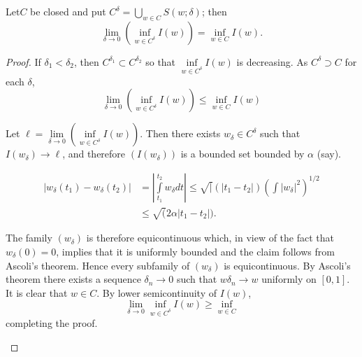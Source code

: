 \begin{lemma}\label{chap22-lem3}
Let\pageoriginale $C$ be closed and put
$C^{\delta}=\bigcup\limits_{w\in C}S(w;\delta)$; then
$$
\lim\limits_{\delta\to 0}(\inf\limits_{w\in
  C^{\delta}}I(w))=\inf\limits_{w\in C}I(w).
$$
\end{lemma}

\begin{proof}
If $\delta_{1}<\delta_{2}$, then $C^{\delta_{1}}\subset
C^{\delta_{2}}$ so that $\inf\limits_{w\in C^{\delta}}I(w)$ is
decreasing. As $C^{\delta}\supset C$ for each $\delta$,
$$
\lim\limits_{\delta\to 0}(\inf\limits_{w\in C^{\delta}}I(w))\leq
\inf\limits_{w\in C}I(w)
$$

Let $\ell=\lim\limits_{\delta\to 0}(\inf\limits_{w\in
  C^{\delta}}I(w))$. Then there exists $w_{\delta}\in C^{\delta}$ such
that $I(w_{\delta})\to \ell$, and therefore $(I(w_{\delta}))$ is a
bounded set bounded by $\alpha$ (say).


\begin{claim*}
\begin{align*}
|w_{\delta}(t_{1})-w_{\delta}(t_{2})| &=
|\int\limits^{t_{2}}_{t_{1}}w_{\delta}dt|\leq \surd
|(|t_{1}-t_{2}|)(\int|w_{\delta}|^{2})^{1/2}\\
&\leq \surd (2\alpha|t_{1}-t_{2}|).
\end{align*}

The family $(w_{\delta})$ is therefore equicontinuous which, in view
of the fact that $w_{\delta}(0)=0$, implies that it is uniformly
bounded and the claim follows from Ascoli's theorem. Hence every
subfamily of $(w_{\delta})$ is equi\-continuous. By Ascoli's theorem
there exists a sequence $\delta_{n}\to 0$ such that $w\delta_{n}\to w$
uniformly on $[0,1]$. It is clear that $w\in C$. By lower
semicontinuity of $I(w)$,
$$
\lim\limits_{\delta\to 0}\inf\limits_{w\in C^{\delta}}I(w)\geq
\inf\limits_{w\in C}
$$
completing the proof.
\end{claim*}
\end{proof}

